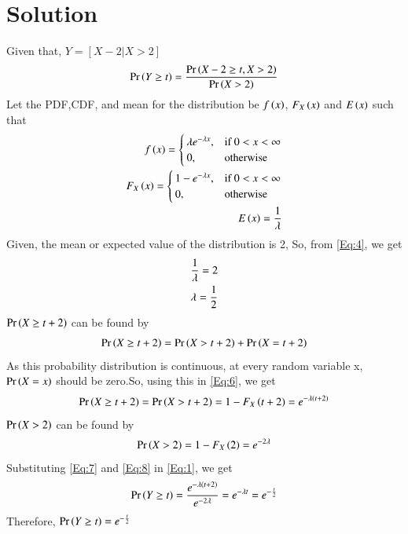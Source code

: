 \documentclass[journal,12pt,twocolumn]{IEEEtran}
\begin{document}
\section{Solution}
Given that, $Y=[X-2|X>2]$
\begin{align}
\Pr\left(Y \geq t\right) = \frac{\Pr\left(X-2 \geq t, X>2\right)}{\Pr\left(X>2\right)} \label{Eq:1}
\end{align}
Let the PDF,CDF, and mean for the distribution be $f\left(x\right)$, $F_X\left(x\right)$ and $E\left(x\right)$ such that
\begin{align}
f\left(x\right) = \begin{cases} \label{Eq:2}
			\lambda e^{-\lambda x}, & \text{if $0 < x< \infty $}\\
            0, & \text{otherwise}
		 \end{cases} \\
F_X\left(x\right) = \begin{cases} \label{Eq:3}
			1 - e^{-\lambda x}, & \text{if $0 < x< \infty $}\\
            0, & \text{otherwise}
		 \end{cases} \\
E\left(x\right) = \frac{1}{\lambda} \label{Eq:4}
\end{align}
Given, the mean or expected value of the distribution is 2, So, from \eqref{Eq:4}, we get
\begin{align}
\frac{1}{\lambda} = 2 \notag \\
\lambda = \frac{1}{2} \label{Eq:5}
\end{align}
$\Pr\left(X \geq t+2\right)$ can be found by
\begin{align}
\Pr\left(X \geq t+2\right) = \Pr\left(X>t+2\right)+\Pr\left(X=t+2\right) \label{Eq:6}
\end{align}
As this probability distribution is continuous, at every random variable x, $\Pr\left(X=x\right)$ should be zero.So, using this in \eqref{Eq:6}, we get
\begin{align}
\Pr\left(X \geq t+2\right) = \Pr\left(X > t+2\right) = 1- F_X\left(t+2\right) = e^{-\lambda \left(t+2\right)}\label{Eq:7}
\end{align}
$\Pr\left(X > 2\right)$ can be found by
\begin{align}
\Pr\left(X >2\right) = 1- F_X\left(2\right) = e^{-2\lambda} \label{Eq:8} 
\end{align}
Substituting \eqref{Eq:7} and \eqref{Eq:8} in \eqref{Eq:1}, we get
\begin{align}
\Pr\left(Y \geq t\right) = \frac{e^{-\lambda \left(t+2\right)}}{e^{-2\lambda}} = e^{-\lambda t} = e^{-\frac{t}{2}}
\end{align}
Therefore, \textbf{$\Pr\left(Y \geq t\right) = e^{-\frac{t}{2}}$}
\newpage
\end{document}
